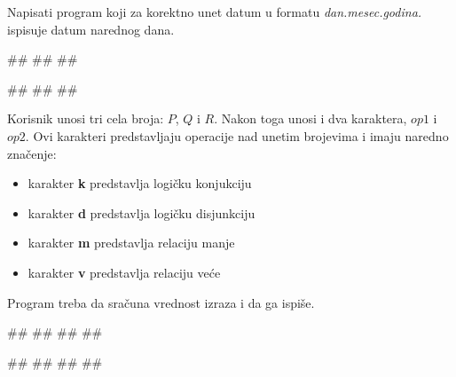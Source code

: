 \begin{Exercise}[label=p1.2_17] 
 Napisati program koji za korektno unet datum u formatu \textit{dan.mesec.godina.} ispisuje datum narednog dana. 
 
\begin{miditest}
\begin{upotreba}{1}
#\naslovInt#
##
##
\end{upotreba}
\end{miditest}
\begin{miditest}
\begin{upotreba}{2}
#\naslovInt#
##
##
\end{upotreba}
\end{miditest}
\end{Exercise}




\begin{Exercise}[label=p1.9_]
Korisnik unosi tri cela broja: $P$, $Q$ i $R$.
Nakon toga unosi i dva karaktera, $op1$ i $op2$. Ovi karakteri predstavljaju operacije nad unetim brojevima i imaju naredno značenje:
\begin{itemize}
\item karakter \textbf{k} predstavlja  logičku konjukciju
\item karakter \textbf{d} predstavlja  logičku disjunkciju
\item karakter \textbf{m} predstavlja  relaciju manje
\item karakter \textbf{v} predstavlja  relaciju veće
\end{itemize}
Program treba da sračuna vrednost izraza 
 i da ga ispiše.

\begin{miditest}
\begin{upotreba}{1}
#\naslovInt#
##
##
##
\end{upotreba}
\end{miditest}
\begin{miditest}
\begin{upotreba}{2}
#\naslovInt#
##
##
##
\end{upotreba}
\end{miditest}

\end{Exercise}

